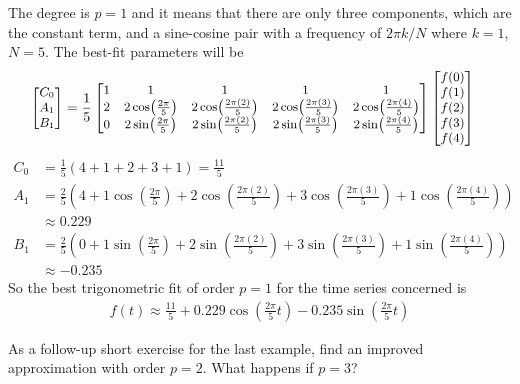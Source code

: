 \begin{solution}
The degree is $p=1$ and it means that there are only three components, which are the constant term, and a sine-cosine pair with a frequency of $2\pi k/N$ where $k=1$, $N=5$. The best-fit parameters will be
\begin{align*}
\small
\begin{bmatrix}
C_0 \\
A_1 \\
B_1
\end{bmatrix}
&= 
\frac{1}{5}
\small
\begin{bmatrix}
1 & 1 & 1 & 1 & 1 \\
2 & 2\cos(\frac{2\pi}{5}) & 2\cos(\frac{2\pi(2)}{5}) & 2\cos(\frac{2\pi(3)}{5}) & 2\cos(\frac{2\pi(4)}{5}) \\
0 & 2\sin(\frac{2\pi}{5}) & 2\sin(\frac{2\pi(2)}{5}) & 2\sin(\frac{2\pi(3)}{5}) & 2\sin(\frac{2\pi(4)}{5})
\end{bmatrix}
\small
\begin{bmatrix}
f(0)\\
f(1)\\
f(2)\\
f(3)\\
f(4)
\end{bmatrix} 
\end{align*}
\begin{align*}
C_0 &= \frac{1}{5} (4+1+2+3+1) = \frac{11}{5} \\
A_1 &= \frac{2}{5} \left(4 + 1\cos(\frac{2\pi}{5}) + 2\cos(\frac{2\pi(2)}{5}) + 3\cos(\frac{2\pi(3)}{5}) + 1\cos(\frac{2\pi(4)}{5})\right) \\
&\approx 0.229 \\
B_1 &= \frac{2}{5} \left(0 + 1\sin(\frac{2\pi}{5}) + 2\sin(\frac{2\pi(2)}{5}) + 3\sin(\frac{2\pi(3)}{5}) + 1\sin(\frac{2\pi(4)}{5})\right) \\
&\approx -0.235
\end{align*}
So the best trigonometric fit of order $p=1$ for the time series concerned is
\begin{align*}
f(t) \approx \frac{11}{5} + 0.229 \cos(\frac{2\pi}{5}t) - 0.235 \sin(\frac{2\pi}{5}t)
\end{align*}
\end{solution}
\begin{exmp}
As a follow-up short exercise for the last example, find an improved approximation with order $p = 2$. What happens if $p = 3$?    
\end{exmp}
